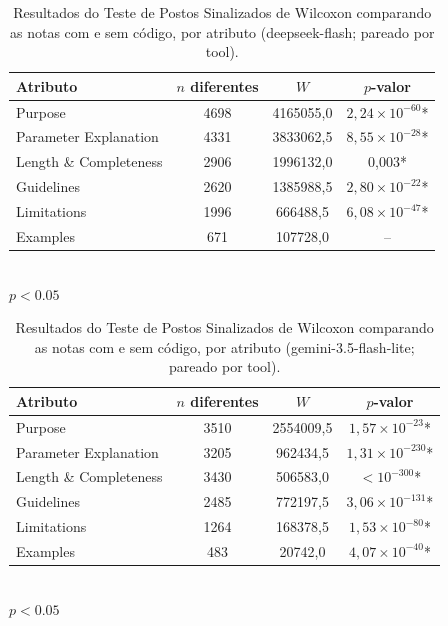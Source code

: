 \begin{table}[H]
\centering
\caption{Resultados do Teste de Postos Sinalizados de Wilcoxon comparando as notas com e sem código, por atributo (deepseek-flash; pareado por tool).}
\label{tab:wilcoxon_deepseek_flash}
\begin{tabular}{lccc}
\toprule
Atributo & $n$ diferentes & $W$ & $p$-valor \\
\midrule
Purpose & 4698 & 4165055,0 & $2,24 \times 10^{-60}$* \\
Parameter Explanation & 4331 & 3833062,5 & $8,55 \times 10^{-28}$* \\
Length \& Completeness & 2906 & 1996132,0 & 0,003* \\
Guidelines & 2620 & 1385988,5 & $2,80 \times 10^{-22}$* \\
Limitations & 1996 & 666488,5 & $6,08 \times 10^{-47}$* \\
Examples & 671 & 107728,0 & -- \\
\bottomrule
\end{tabular}
\\[4pt]
{\footnotesize * $p<0.05$}
\end{table}

\begin{table}[H]
\centering
\caption{Resultados do Teste de Postos Sinalizados de Wilcoxon comparando as notas com e sem código, por atributo (gemini-3.5-flash-lite; pareado por tool).}
\label{tab:wilcoxon_gemini_3_5_flash_lite}
\begin{tabular}{lccc}
\toprule
Atributo & $n$ diferentes & $W$ & $p$-valor \\
\midrule
Purpose & 3510 & 2554009,5 & $1,57 \times 10^{-23}$* \\
Parameter Explanation & 3205 & 962434,5 & $1,31 \times 10^{-230}$* \\
Length \& Completeness & 3430 & 506583,0 & $< 10^{-300}$* \\
Guidelines & 2485 & 772197,5 & $3,06 \times 10^{-131}$* \\
Limitations & 1264 & 168378,5 & $1,53 \times 10^{-80}$* \\
Examples & 483 & 20742,0 & $4,07 \times 10^{-40}$* \\
\bottomrule
\end{tabular}
\\[4pt]
{\footnotesize * $p<0.05$}
\end{table}

